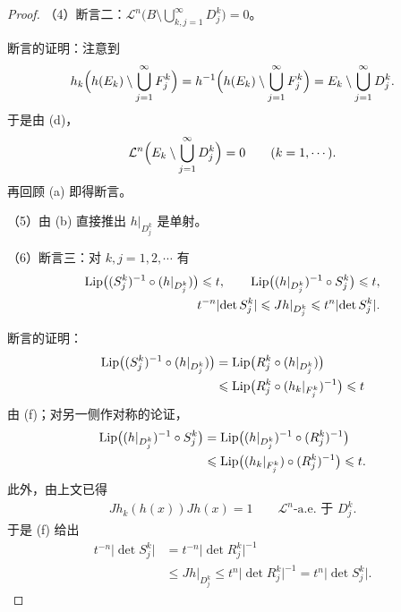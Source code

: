 \documentclass[../../main.tex]{subfiles}%
\begin{document}
\begin{proof}
（4）断言二：$\mathcal{L}^n\bigl(B\setminus\bigcup_{k,j=1}^{\infty}D_j^k\bigr)=0$。

断言的证明：注意到
\begin{align*}
h_k\Bigl(h(E_k)\setminus\bigcup_{j=1}^{\infty}F_j^k\Bigr)=h^{-1}\Bigl(h(E_k)\setminus\bigcup_{j=1}^{\infty}F_j^k\Bigr)=E_k\setminus\bigcup_{j=1}^{\infty}D_j^k.
\end{align*}
于是由 (d)，
\begin{align*}
\mathcal{L}^n\Bigl(E_k\setminus\bigcup_{j=1}^{\infty}D_j^k\Bigr)=0\qquad(k=1,\cdots).
\end{align*}
再回顾 (a) 即得断言。

（5）由 (b) 直接推出 $h|_{D_j^k}$ 是单射。

（6）断言三：对 $k,j=1,2,\cdots$ 有
\begin{align*}
\operatorname{Lip}\bigl((S_j^k)^{-1}\circ(h|_{D_j^k})\bigr)\leqslant t,\qquad\operatorname{Lip}\bigl((h|_{D_j^k})^{-1}\circ S_j^k\bigr)\leqslant t,\\
t^{-n}\lvert\det S_j^k\rvert\leqslant Jh|_{D_j^k}\leqslant t^n\lvert\det S_j^k\rvert.
\end{align*}

断言的证明：
\begin{align*}
\operatorname{Lip}\bigl((S_j^k)^{-1}\circ(h|_{D_j^k})\bigr)&=\operatorname{Lip}\bigl(R_j^k\circ(h|_{D_j^k})\bigr)\\
&\leqslant\operatorname{Lip}\bigl(R_j^k\circ(h_k|_{F_j^k})^{-1}\bigr)\leqslant t
\end{align*}
由 (f)；对另一侧作对称的论证，
\begin{align*}
\operatorname{Lip}\bigl((h|_{D_j^k})^{-1}\circ S_j^k\bigr)&=\operatorname{Lip}\bigl((h|_{D_j^k})^{-1}\circ(R_j^k)^{-1}\bigr)\\
&\leqslant\operatorname{Lip}\bigl((h_k|_{F_j^k})\circ(R_j^k)^{-1}\bigr)\leqslant t.
\end{align*}
此外，由上文已得
\begin{align*}
Jh_k(h(x))Jh(x)=1\qquad\mathcal{L}^n\text{-a.e. 于 }D_j^k.
\end{align*}
于是 (f) 给出
\begin{align*}
t^{-n}\lvert\det S_j^k\rvert&=t^{-n}\lvert\det R_j^k\rvert^{-1}\\
&\leqslant Jh|_{D_j^k}\leqslant t^n\lvert\det R_j^k\rvert^{-1}=t^n\lvert\det S_j^k\rvert.
\end{align*}
\end{proof}
\end{document}
